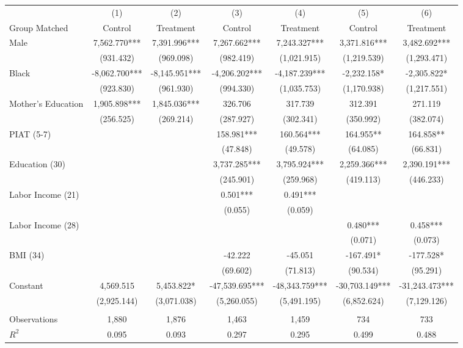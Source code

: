 \begin{tabular}{lcccccc} \toprule
 & (1) & (2) & (3) & (4) & (5) & (6) \\ 
Group Matched & Control & Treatment & Control & Treatment & Control & Treatment \\ \mdirule
Male & 7,562.770*** & 7,391.996*** & 7,267.662*** & 7,243.327*** & 3,371.816*** & 3,482.692*** \\
 & (931.432) & (969.098) & (982.419) & (1,021.915) & (1,219.539) & (1,293.471) \\
Black & -8,062.700*** & -8,145.951*** & -4,206.202*** & -4,187.239*** & -2,232.158* & -2,305.822* \\
 & (923.830) & (961.930) & (994.330) & (1,035.753) & (1,170.938) & (1,217.551) \\
 Mother's Education & 1,905.898*** & 1,845.036*** & 326.706 & 317.739 & 312.391 & 271.119 \\
 & (256.525) & (269.214) & (287.927) & (302.341) & (350.992) & (382.074) \\
PIAT (5-7) &  &  & 158.981*** & 160.564*** & 164.955** & 164.858** \\
 &  &  & (47.848) & (49.578) & (64.085) & (66.831) \\
Education (30) &  &  & 3,737.285*** & 3,795.924*** & 2,259.366*** & 2,390.191*** \\
 &  &  & (245.901) & (259.968) & (419.113) & (446.233) \\
Labor Income (21) &  &  & 0.501*** & 0.491*** &  &  \\
 &  &  & (0.055) & (0.059) &  &  \\
Labor Income (28) &  &  &  &  & 0.480*** & 0.458*** \\
 &  &  &  &  & (0.071) & (0.073) \\
 BMI (34) &  &  & -42.222 & -45.051 & -167.491* & -177.528* \\
 &  &  & (69.602) & (71.813) & (90.534) & (95.291) \\
Constant & 4,569.515 & 5,453.822* & -47,539.695*** & -48,343.759*** & -30,703.149*** & -31,243.473*** \\
 & (2,925.144) & (3,071.038) & (5,260.055) & (5,491.195) & (6,852.624) & (7,129.126) \\ \\ \midrule
 Observations & 1,880 & 1,876 & 1,463 & 1,459 & 734 & 733 \\
$R^2$ & 0.095 & 0.093 & 0.297 & 0.295 & 0.499 & 0.488 \\ \bottomrule
\end{tabular}
